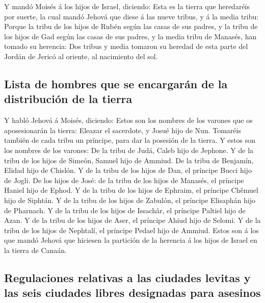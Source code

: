  Y mandó Moisés á los hijos de Israel, diciendo: Esta es
la tierra que heredaréis por suerte, la cual mandó Jehová que diese á
las nueve tribus, y á la media tribu:  Porque la tribu de
los hijos de Rubén según las casas de sus padres, y la tribu de los
hijos de Gad según las casas de sus padres, y la media tribu de Manasés,
han tomado su herencia:  Dos tribus y media tomaron su
heredad de esta parte del Jordán de Jericó al oriente, al nacimiento del
sol.

\hypertarget{lista-de-hombres-que-se-encargaruxe1n-de-la-distribuciuxf3n-de-la-tierra}{%
\subsection{Lista de hombres que se encargarán de la distribución de la
tierra}\label{lista-de-hombres-que-se-encargaruxe1n-de-la-distribuciuxf3n-de-la-tierra}}

 Y habló Jehová á Moisés, diciendo:  Estos
son los nombres de los varones que os aposesionarán la tierra: Eleazar
el sacerdote, y Josué hijo de Nun.  Tomaréis también de
cada tribu un príncipe, para dar la posesión de la tierra.
 Y estos son los nombres de los varones: De la tribu de
Judá, Caleb hijo de Jephone.  Y de la tribu de los hijos
de Simeón, Samuel hijo de Ammiud.  De la tribu de
Benjamín, Elidad hijo de Chislón.  Y de la tribu de los
hijos de Dan, el príncipe Bucci hijo de Jogli.  De los
hijos de José: de la tribu de los hijos de Manasés, el príncipe Haniel
hijo de Ephod.  Y de la tribu de los hijos de Ephraim, el
príncipe Chêmuel hijo de Siphtán.  Y de la tribu de los
hijos de Zabulón, el príncipe Elisaphán hijo de Pharnach.
 Y de la tribu de los hijos de Issachâr, el príncipe
Paltiel hijo de Azan.  Y de la tribu de los hijos de
Aser, el príncipe Ahiud hijo de Selomi.  Y de la tribu de
los hijos de Nephtalí, el príncipe Pedael hijo de Ammiud.
 Estos son á los que mandó Jehová que hiciesen la
partición de la herencia á los hijos de Israel en la tierra de Canaán.

\hypertarget{regulaciones-relativas-a-las-ciudades-levitas-y-las-seis-ciudades-libres-designadas-para-asesinos}{%
\subsection{Regulaciones relativas a las ciudades levitas y las seis
ciudades libres designadas para
asesinos}\label{regulaciones-relativas-a-las-ciudades-levitas-y-las-seis-ciudades-libres-designadas-para-asesinos}}

